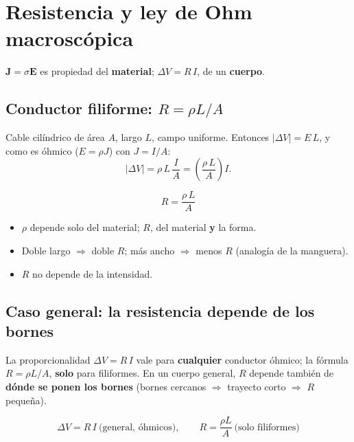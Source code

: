 \documentclass[12pt,a4paper]{article}
\begin{document}


\section{Resistencia y ley de Ohm macroscópica}

$\mathbf{J}=\sigma\mathbf{E}$ es propiedad del \textbf{material};
$\Delta V=R\,I$, de un \textbf{cuerpo}.

\subsection{Conductor filiforme: $R=\rho L/A$}

Cable cilíndrico de área $A$, largo $L$, campo uniforme. Entonces
$|\Delta V| = E\,L$, y como es óhmico ($E=\rho J$) con $J=I/A$:
\[
|\Delta V| = \rho\,L\,\frac{I}{A} = \left(\frac{\rho\,L}{A}\right) I.
\]

\begin{keybox}
  \[
  \boxed{R = \frac{\rho\, L}{A}}
  \]
\end{keybox}

\begin{itemize}[nosep]
  \item $\rho$ depende solo del material; $R$, del material \textbf{y} la
        forma.
  \item Doble largo $\Rightarrow$ doble $R$; más ancho $\Rightarrow$
        menos $R$ (analogía de la manguera).
  \item $R$ no depende de la intensidad.
\end{itemize}

\subsection{Caso general: la resistencia depende de los bornes}

La proporcionalidad $\Delta V = R\,I$ vale para \textbf{cualquier}
conductor óhmico; la fórmula $R=\rho L/A$, \textbf{solo} para
filiformes. En un cuerpo general, $R$ depende también de \textbf{dónde se
ponen los bornes} (bornes cercanos $\Rightarrow$ trayecto corto
$\Rightarrow$ $R$ pequeña).

\begin{keybox}[Resumen]
  \[
  \boxed{\Delta V = R\,I \ \text{(general, óhmicos)}}, \qquad
  \boxed{R = \frac{\rho L}{A} \ \text{(solo filiformes)}}
  \]
\end{keybox}
\end{document}
